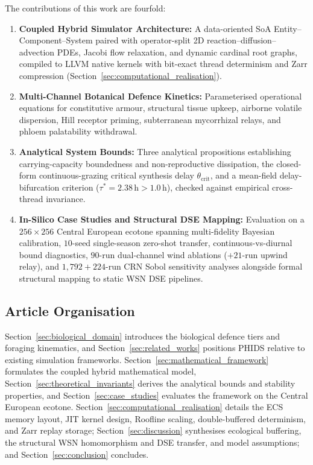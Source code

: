 The contributions of this work are fourfold:
\begin{enumerate}
  \item \textbf{Coupled Hybrid Simulator Architecture:} A data-oriented SoA Entity--Component--System paired with operator-split 2D reaction--diffusion--advection PDEs, Jacobi flow relaxation, and dynamic cardinal root graphs, compiled to LLVM native kernels with bit-exact thread determinism and Zarr compression (Section~\ref{sec:computational_realisation}).
  \item \textbf{Multi-Channel Botanical Defence Kinetics:} Parameterised operational equations for constitutive armour, structural tissue upkeep, airborne volatile dispersion, Hill receptor priming, subterranean mycorrhizal relays, and phloem palatability withdrawal.
  \item \textbf{Analytical System Bounds:} Three analytical propositions establishing carrying-capacity boundedness and non-reproductive dissipation, the closed-form continuous-grazing critical synthesis delay $\theta_{\text{crit}}$, and a mean-field delay-bifurcation criterion ($\tau^* = 2.38\,\text{h} > 1.0\,\text{h}$), checked against empirical cross-thread invariance.
  \item \textbf{In-Silico Case Studies and Structural DSE Mapping:} Evaluation on a $256 \times 256$ Central European ecotone spanning multi-fidelity Bayesian calibration, $10$-seed single-season zero-shot transfer, continuous-vs-diurnal bound diagnostics, $90$-run dual-channel wind ablations ($+21$-run upwind relay), and $1{,}792 + 224$-run CRN Sobol sensitivity analyses alongside formal structural mapping to static WSN DSE pipelines.
\end{enumerate}

\subsection{Article Organisation}
\label{sec:intro_organization}

Section~\ref{sec:biological_domain} introduces the biological defence tiers and foraging kinematics, and Section~\ref{sec:related_works} positions PHIDS relative to existing simulation frameworks. Section~\ref{sec:mathematical_framework} formulates the coupled hybrid mathematical model, Section~\ref{sec:theoretical_invariants} derives the analytical bounds and stability properties, and Section~\ref{sec:case_studies} evaluates the framework on the Central European ecotone. Section~\ref{sec:computational_realisation} details the ECS memory layout, JIT kernel design, Roofline scaling, double-buffered determinism, and Zarr replay storage; Section~\ref{sec:discussion} synthesises ecological buffering, the structural WSN homomorphism and DSE transfer, and model assumptions; and Section~\ref{sec:conclusion} concludes.
